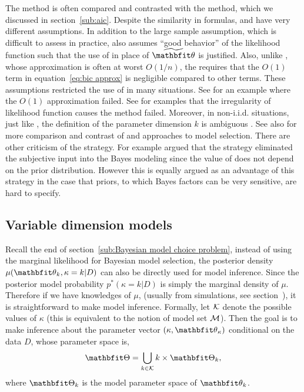 \documentclass[11pt, hyper, bib, fontset=Minion]{marticle}
\begin{document}
The \bic method is often compared and contrasted with the \aic method, which
we discussed in section~\ref{sub:aic}. Despite the similarity in formulas,
\aic and \bic have very different assumptions. In addition to the large sample
assumption, which is difficult to assess in practice, \bic also assumes ``good
behavior'' of the likelihood function such that the use of \mle in place of
$\tbth$ is justified. Also, unlike \aic, whose approximation is often at worst
$O(1/n)$, the \bic requires that the $O(1)$ term in equation~\eqref{eq:bic
  approx} is negligible compared to other terms. These assumptions restricted
the use of \bic in many situations. See \textcite{Gelfand:1994ux} for an
example where the $O(1)$ approximation failed.  See \textcite{Berger:2001uy}
for examples that the irregularity of likelihood function causes the \bic
method failed. Moreover, in non-i.i.d. situations, just like \aic, the
definition of the parameter dimension $k$ is ambiguous
\parencite{Spiegelhalter:1998uc, Kass:1995vb}. See also \textcite[][chap.~5
and chap.~6]{Burnham:2002wc} for more comparison and contrast of \aic and \bic
approaches to model selection. There are other criticism of the \bic strategy.
For example \textcite[][chap.~7]{Robert:2007tc} argued that the \bic strategy
eliminated the subjective input into the Bayes modeling since the value of
\bic does not depend on the prior distribution. However this is equally argued
as an advantage of this strategy in the case that priors, to which Bayes
factors can be very sensitive, are hard to specify.

\subsection{Variable dimension models}
\label{sub:Variable dimension models}

Recall the end of section~\ref{sub:Bayesian model choice problem}, instead of
using the marginal likelihood for Bayesian model selection, the posterior
density $\mu(\bth_k,\kappa=k|D)$ can also be directly used for model
inference. Since the posterior model probability $p^*(\kappa=k|D)$ is simply
the marginal density of $\mu$. Therefore if we have knowledges of $\mu$,
(usually from simulations, see section~), it is
straightforward to make model inference. Formally, let $\mathcal{K}$ denote the
possible values of $\kappa$ (this is equivalent to the notion of model set
$\mathcal{M}$). Then the goal is to make inference about the parameter vector
$(\kappa, \bth_{\kappa})$ conditional on the data $D$, whose parameter space
is,
\begin{equation}
  \bTh = \bigcup_{k\in\calK}{k}\times\bTh_k,
  \label{eq:variable dimension parameter space}
\end{equation}
where $\bTh_k$ is the model parameter space of $\bth_k$.
\end{document}
